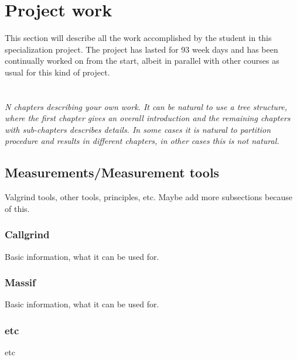 \section{Project work}
This section will describe all the work accomplished by the student in this specialization project. The project has lasted for 93 week days and has been continually worked on from the start, albeit in parallel with other courses as usual for this kind of project. 
\\\\

\noindent
\textit{\color{red}\\
N chapters describing your own work. It can be natural to use a tree structure, where the first chapter gives an overall introduction and the remaining chapters with sub-chapters describes details. In some cases it is natural to partition procedure and results in different chapters, in other cases this is not natural.}\\


\subsection{Measurements/Measurement tools}
Valgrind tools, other tools, principles, etc. Maybe add more subsections because of this. \\

\subsubsection{Callgrind}
Basic information, what it can be used for. \\

\subsubsection{Massif}
Basic information, what it can be used for. \\

\subsubsection{etc}
etc\\\\\\


